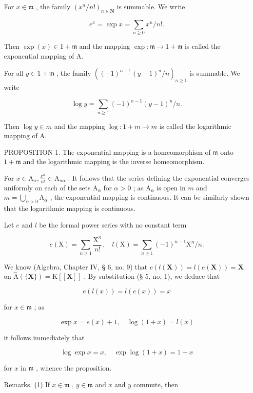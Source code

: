 For \(x \in \mathfrak{m}\) , the family \((x^n / n!)_{n \in \mathbf{N}}\) is summable. We write

\[
e ^ {x} = \exp x = \sum_ {n \geqslant 0} x ^ {n} / n!.\tag{1}
\]

Then \(\exp (x)\in 1 + \mathfrak{m}\) and the mapping \(\exp \colon \mathfrak{m}\to 1 + \mathfrak{m}\) is called the exponential mapping of A.

For all \(y \in 1 + \mathfrak{m}\) , the family \(((-1)^{n-1}(y - 1)^n / n)_{n \geqslant 1}\) is summable. We write

\[
\log y = \sum_ {n \geqslant 1} (- 1) ^ {n - 1} (y - 1) ^ {n} / n.\tag{2}
\]

Then \(\log y \in m\) and the mapping \(\log: 1 + m \to m\) is called the logarithmic mapping of A.

PROPOSITION 1. The exponential mapping is a homeomorphism of \(\mathfrak{m}\) onto \(1 + \mathfrak{m}\) and the logarithmic mapping is the inverse homeomorphism.

For \(x \in \mathrm{A}_{\alpha}, \frac{x^n}{n!} \in \mathrm{A}_{n\alpha}\) . It follows that the series defining the exponential converges uniformly on each of the sets \(\mathrm{A}_{\alpha}\) for \(\alpha > 0\) ; as \(\mathrm{A}_{\alpha}\) is open in \(m\) and \(m = \bigcup_{\alpha > 0} \mathrm{A}_{\alpha}\) , the exponential mapping is continuous. It can be similarly shown that the logarithmic mapping is continuous.

Let \(e\) and \(l\) be the formal power series with no constant term

\[
e (\mathrm{X}) = \sum_ {n \geqslant 1} \frac {\mathrm{X} ^ {n}}{n !}, \quad l (\mathrm{X}) = \sum_ {n \geqslant 1} (- 1) ^ {n - 1} \mathrm{X} ^ {n} / n.
\]

We know (Algebra, Chapter IV, § 6, no. 9) that \(e(l(\mathbf{X})) = l(e(\mathbf{X})) = \mathbf{X}\) on \(\hat{\mathrm{A}}(\{\mathbf{X}\}) = \mathrm{K}[[\mathbf{X}]]\) . By substitution (§ 5, no. 1), we deduce that

\[
e (l (x)) = l (e (x)) = x
\]

for \(x\in \mathfrak{m}\) ; as

\[
\exp x = e (x) + 1, \quad \log (1 + x) = l (x)
\]

it follows immediately that

\[
\log \exp x = x, \quad \exp \log (1 + x) = 1 + x
\]

for \(x\) in \(\mathfrak{m}\) , whence the proposition.

Remarks. (1) If \(x \in \mathfrak{m}\) , \(y \in \mathfrak{m}\) and \(x\) and \(y\) commute, then

